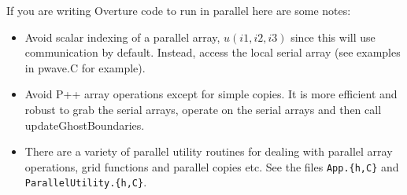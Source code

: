 \documentclass{article}
\begin{document}
 If you are writing Overture code to run in parallel here are some notes:
\begin{itemize}
  \item Avoid scalar indexing of a parallel array, $u(i1,i2,i3)$ since this will use communication by default.
        Instead, access the local serial array (see examples in pwave.C for example). 
  \item Avoid P++ array operations except for simple copies.  It is more efficient and robust to grab the serial
        arrays, operate on the serial arrays and then call updateGhostBoundaries. 
  \item There are a variety of parallel utility routines for dealing with parallel array operations,
        grid functions and parallel copies etc. See the files {\tt App.\{h,C\}} and {\tt ParallelUtility.\{h,C\}}.
\end{itemize}
\end{document}
